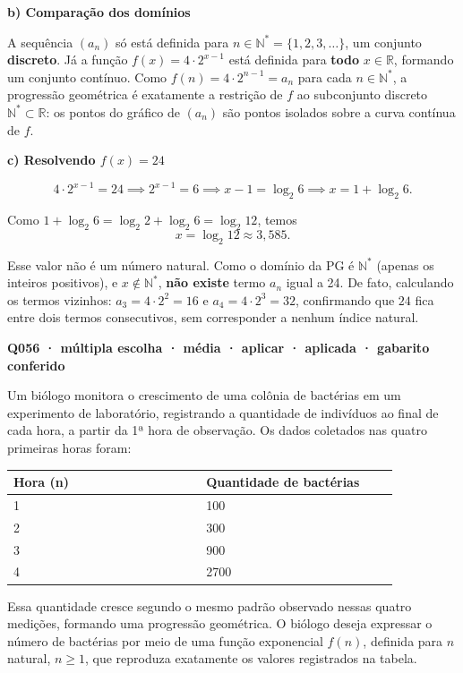\documentclass[11pt,a4paper]{article}
\begin{document}
\textbf{b) Comparação dos domínios}

A sequência $(a_n)$ só está definida para $n \in \mathbb{N}^{*} = \{1,2,3,\dots\}$, um conjunto \textbf{discreto}. Já a função $f(x)=4\cdot2^{x-1}$ está definida para \textbf{todo} $x \in \mathbb{R}$, formando um conjunto contínuo. Como $f(n) = 4\cdot 2^{n-1} = a_n$ para cada $n\in\mathbb{N}^{*}$, a progressão geométrica é exatamente a restrição de $f$ ao subconjunto discreto $\mathbb{N}^{*}\subset\mathbb{R}$: os pontos do gráfico de $(a_n)$ são pontos isolados sobre a curva contínua de $f$.

\textbf{c) Resolvendo $f(x)=24$}

$$4\cdot 2^{x-1} = 24 \implies 2^{x-1} = 6 \implies x - 1 = \log_2 6 \implies x = 1 + \log_2 6.$$

Como $1+\log_2 6 = \log_2 2 + \log_2 6 = \log_2 12$, temos
$$x = \log_2 12 \approx 3{,}585.$$

Esse valor não é um número natural. Como o domínio da PG é $\mathbb{N}^{*}$ (apenas os inteiros positivos), e $x \notin \mathbb{N}^{*}$, \textbf{não existe} termo $a_n$ igual a 24. De fato, calculando os termos vizinhos: $a_3 = 4\cdot2^2=16$ e $a_4=4\cdot2^3=32$, confirmando que $24$ fica entre dois termos consecutivos, sem corresponder a nenhum índice natural.

\bigskip\noindent\textbf{Q056 · múltipla escolha · média · aplicar · aplicada · gabarito conferido}\par\nopagebreak
Um biólogo monitora o crescimento de uma colônia de bactérias em um experimento de laboratório, registrando a quantidade de indivíduos ao final de cada hora, a partir da 1ª hora de observação. Os dados coletados nas quatro primeiras horas foram:

\begin{center}
\begin{tabular}{|p{0.430\linewidth}|p{0.430\linewidth}|}
\hline
\textbf{Hora (n)} & \textbf{Quantidade de bactérias} \\
\hline
1 & 100 \\
\hline
2 & 300 \\
\hline
3 & 900 \\
\hline
4 & 2700 \\
\hline
\end{tabular}
\end{center}

Essa quantidade cresce segundo o mesmo padrão observado nessas quatro medições, formando uma progressão geométrica. O biólogo deseja expressar o número de bactérias por meio de uma função exponencial $f(n)$, definida para $n$ natural, $n \geq 1$, que reproduza exatamente os valores registrados na tabela.
\end{document}
